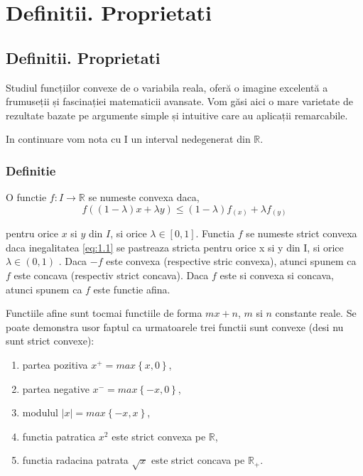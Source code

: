 \documentclass[a4paper,12pt,oneside]{report}
\begin{document}
\maketitle

\tableofcontents

%
%
%
%
\chapter{Definitii. Proprietati}

\section{Definitii. Proprietati}

Studiul funcțiilor convexe de o variabila reala, oferă o imagine excelentă a frumuseții și fascinației matematicii avansate. Vom găsi aici o mare varietate de rezultate bazate pe argumente simple și intuitive care au aplicații remarcabile.

In continuare vom nota cu I un interval nedegenerat din \(\mathbb{R}\).

\subsection{Definitie}

O functie \(f: I \rightarrow \mathbb{R}\) se numeste convexa daca,
\begin{displaymath}
f \left ( \left ( 1 - \lambda  \right )x + \lambda y \right )\leq \left ( 1 - \lambda  \right ) f_{\left ( x \right )} + \lambda f_{\left ( y \right )} 	\label{eq:1.1} \tag{1.1}
\end{displaymath}

pentru orice \(x\) si \(y\) din \(I\), si orice \(\lambda \in \left [ 0,1 \right ]\). Functia \(f\) se numeste strict convexa daca inegalitatea \ref{eq:1.1} se pastreaza  stricta pentru orice x si y din I, si orice  \(\lambda \in \left ( 0,1 \right )\) . Daca \(-f\) este convexa (respective stric convexa), atunci spunem ca \(f\) este concava (respectiv strict concava). Daca \(f\) este si convexa si concava, atunci spunem ca \(f\) este functie afina. 


Functiile afine sunt tocmai functiile de forma \(mx + n\),  \(m\) si \(n\) constante reale.
Se poate demonstra usor faptul ca urmatoarele trei functii sunt convexe (desi nu sunt strict convexe):
\begin{enumerate}
  \item partea pozitiva \(x^{+} = max \left \{ x,0 \right \}\),
  \item partea negative \(x^{-} = max \left \{ -x,0 \right \}\), 
  \item modulul \(\left | x \right | = max \left \{ -x,x \right \}\),
  \item functia patratica \(x^{2}\)  este strict convexa pe \(\mathbb{R}\),
  \item functia radacina patrata \(\sqrt{x}\) este strict concava pe \(\mathbb{R}_{+}\). 
\end{enumerate}
\end{document}
